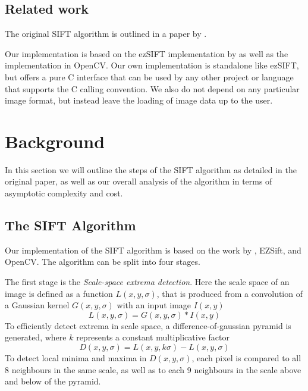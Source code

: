 \documentclass[letterpaper]{article}
\begin{document}
\subsection*{Related work}
The original SIFT algorithm is outlined in a paper by \citet{lowe2004distinctive}\cite{lowe1999object}.

Our implementation is based on the ezSIFT implementation by \citet{ezsift} as well as the implementation in OpenCV\cite{opencv}. Our own implementation is standalone like ezSIFT, but offers a pure C interface that can be used by any other project or language that supports the C calling convention. We also do not depend on any particular image format, but instead leave the loading of image data up to the user.

\section{Background}\label{sec:background}
In this section we will outline the steps of the SIFT algorithm as detailed in the original paper\cite{lowe2004distinctive}, as well as our overall analysis of the algorithm in terms of asymptotic complexity and cost.

\subsection*{The SIFT Algorithm}
Our implementation of the SIFT algorithm is based on the work by \citet{lowe2004distinctive}, EZSift\cite{ezsift}, and OpenCV\cite{opencv}. The algorithm can be split into four stages.

The first stage is the \emph{Scale-space extrema detection}. Here the scale space of an image is defined as a function $L(x,y,\sigma)$, that is produced from a convolution of a Gaussian kernel $G(x,y,\sigma)$ with an input image $I(x,y)$
\begin{equation}
    L(x,y,\sigma)=G(x,y,\sigma) * I(x,y)
\end{equation}
To efficiently detect extrema in scale space, a difference-of-gaussian pyramid is generated, where $k$ represents a constant multiplicative factor
\begin{equation}
    D(x,y,\sigma) = L(x,y,k\sigma) - L(x,y,\sigma)
\end{equation}
To detect local minima and maxima in $D(x,y,\sigma)$, each pixel is compared to all 8 neighbours in the same scale, as well as to each 9 neighbours in the scale above and below of the pyramid.
\end{document}
